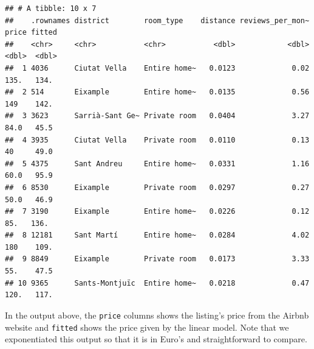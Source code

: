 \documentclass[]{article}
\newenvironment{Shaded}{\begin{snugshade}}{\end{snugshade}}
\newcommand{\DataTypeTok}[1]{\textcolor[rgb]{0.13,0.29,0.53}{#1}}
\newcommand{\DecValTok}[1]{\textcolor[rgb]{0.00,0.00,0.81}{#1}}
\newcommand{\FloatTok}[1]{\textcolor[rgb]{0.00,0.00,0.81}{#1}}
\newcommand{\KeywordTok}[1]{\textcolor[rgb]{0.13,0.29,0.53}{\textbf{#1}}}
\newcommand{\NormalTok}[1]{#1}
\newcommand{\OperatorTok}[1]{\textcolor[rgb]{0.81,0.36,0.00}{\textbf{#1}}}
\newcommand{\OtherTok}[1]{\textcolor[rgb]{0.56,0.35,0.01}{#1}}
\newcommand{\StringTok}[1]{\textcolor[rgb]{0.31,0.60,0.02}{#1}}
\begin{document}
\begin{Shaded}
\end{Shaded}

\begin{verbatim}
## # A tibble: 10 x 7
##    .rownames district        room_type    distance reviews_per_mon~ price fitted
##    <chr>     <chr>           <chr>           <dbl>            <dbl> <dbl>  <dbl>
##  1 4036      Ciutat Vella    Entire home~   0.0123             0.02 135.   134. 
##  2 514       Eixample        Entire home~   0.0135             0.56 149    142. 
##  3 3623      Sarrià-Sant Ge~ Private room   0.0404             3.27  84.0   45.5
##  4 3935      Ciutat Vella    Private room   0.0110             0.13  40     49.0
##  5 4375      Sant Andreu     Entire home~   0.0331             1.16  60.0   95.9
##  6 8530      Eixample        Private room   0.0297             0.27  50.0   46.9
##  7 3190      Eixample        Entire home~   0.0226             0.12  85.   136. 
##  8 12181     Sant Martí      Entire home~   0.0284             4.02 180    109. 
##  9 8849      Eixample        Private room   0.0173             3.33  55.    47.5
## 10 9365      Sants-Montjuïc  Entire home~   0.0218             0.47 120.   117.
\end{verbatim}

In the output above, the \texttt{price} columns shows the listing's
price from the Airbnb website and \texttt{fitted} shows the price given
by the linear model. Note that we exponentiated this output so that it
is in Euro's and straightforward to compare.
\end{document}
